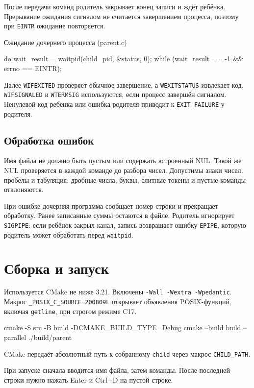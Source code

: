 \documentclass[12pt,a4paper]{article}
\begin{document}
После передачи команд родитель закрывает конец записи и ждёт ребёнка. Прерывание ожидания сигналом не считается завершением процесса, поэтому при \texttt{EINTR} ожидание повторяется.
\begin{listingblock}{Ожидание дочернего процесса (parent.c)}
\begin{code}
do {
    wait_result = waitpid(child_pid, &status, 0);
} while (wait_result == -1 && errno == EINTR);
\end{code}
\end{listingblock}

Далее \texttt{WIFEXITED} проверяет обычное завершение, а \texttt{WEXITSTATUS} извлекает код. \texttt{WIFSIGNALED} и \texttt{WTERMSIG} используются, если процесс завершён сигналом. Ненулевой код ребёнка или ошибка родителя приводит к \texttt{EXIT\_FAILURE} у родителя.

\subsection{Обработка ошибок}
Имя файла не должно быть пустым или содержать встроенный NUL. Такой же NUL проверяется в каждой команде до разбора чисел. Допустимы знаки чисел, пробелы и табуляция; дробные числа, буквы, слитные токены и пустые команды отклоняются.

При ошибке дочерняя программа сообщает номер строки и прекращает обработку. Ранее записанные суммы остаются в файле. Родитель игнорирует \texttt{SIGPIPE}: если ребёнок закрыл канал, запись возвращает ошибку \texttt{EPIPE}, которую родитель может обработать перед \texttt{waitpid}.

\section{Сборка и запуск}

Используется CMake не ниже 3.21. Включены \texttt{-Wall -Wextra -Wpedantic}. Макрос \texttt{\_POSIX\_C\_SOURCE=200809L} открывает объявления POSIX-функций, включая \texttt{getline}, при строгом режиме C17.
\begin{terminal}
cmake -S src -B build -DCMAKE_BUILD_TYPE=Debug
cmake --build build --parallel
./build/parent
\end{terminal}

CMake передаёт абсолютный путь к собранному \texttt{child} через макрос \texttt{CHILD\_PATH}.

При запуске сначала вводится имя файла, затем команды. После последней строки нужно нажать Enter и Ctrl+D на пустой строке.
\end{document}
